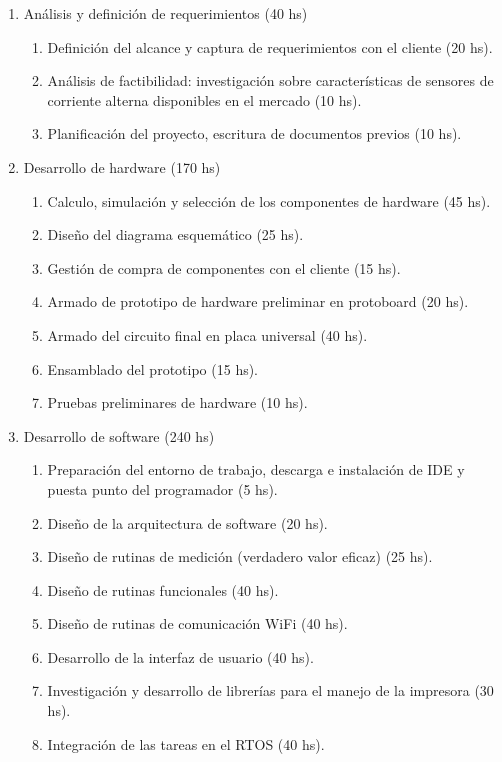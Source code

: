 \documentclass[11pt]{charter}
\begin{document}
\begin{enumerate}
\item Análisis y definición de requerimientos (40 hs)
	\begin{enumerate}
	\item Definición del alcance y captura de requerimientos con el cliente (20 hs).
	\item Análisis de factibilidad: investigación sobre características de sensores de corriente alterna disponibles en el mercado (10 hs).
	\item Planificación del proyecto, escritura de documentos previos (10 hs).
	\end{enumerate}
\item Desarrollo de hardware (170 hs)
	\begin{enumerate}
	\item Calculo, simulación y selección de los componentes de hardware (45 hs).
	\item Diseño del diagrama esquemático (25 hs).
	\item Gestión de compra de componentes con el cliente (15 hs).
	\item Armado de prototipo de hardware preliminar en protoboard (20 hs).
	\item Armado del circuito final en placa universal (40 hs).
	\item Ensamblado del prototipo (15 hs).
	\item Pruebas preliminares de hardware (10 hs).
	\end{enumerate}
\item Desarrollo de software (240 hs)
	\begin{enumerate}
	\item Preparación del entorno de trabajo, descarga e instalación de IDE y puesta punto del programador (5 hs).
	\item Diseño de la arquitectura de software (20 hs).
	\item Diseño de rutinas de medición (verdadero valor eficaz) (25 hs).
	\item Diseño de rutinas funcionales (40 hs).
	\item Diseño de rutinas de comunicación WiFi (40 hs).
	\item Desarrollo de la interfaz de usuario (40 hs).
	\item Investigación y desarrollo de librerías para el manejo de la impresora (30 hs).
	\item Integración de las tareas en el RTOS (40 hs).
	\end{enumerate}

\end{enumerate}
\end{document}
